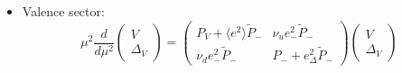 \documentclass[a4paper,twoside]{article}
\begin{document}
\begin{itemize}
\item Valence sector:
\begin{equation*}
\mu^2\frac{d}{d\mu^2}
\begin{pmatrix}
V \\
\Delta_V
\end{pmatrix}
=
\begin{pmatrix}
P_V+\langle e^2\rangle \tilde{P}_{-} & \nu_ue^2_-\tilde{P}_{-}\\
 \nu_de^2_-\tilde{P}_{-}& P_-+e_\Delta^2 \tilde{P}_{-}
\end{pmatrix}
\begin{pmatrix}
V \\
\Delta_V
\end{pmatrix}
\end{equation*}


\end{itemize}
\end{document}
